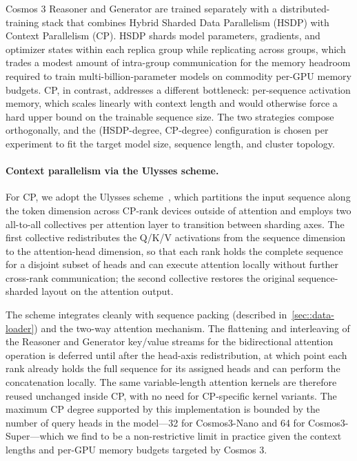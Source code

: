 Cosmos 3 Reasoner and Generator are trained separately with a distributed-training stack that combines Hybrid Sharded Data Parallelism (HSDP) with Context Parallelism (CP). HSDP shards model parameters, gradients, and optimizer states within each replica group while replicating across groups, which trades a modest amount of intra-group communication for the memory headroom required to train multi-billion-parameter models on commodity per-GPU memory budgets. CP, in contrast, addresses a different bottleneck: per-sequence activation memory, which scales linearly with context length and would otherwise force a hard upper bound on the trainable sequence size. The two strategies compose orthogonally, and the (HSDP-degree, CP-degree) configuration is chosen per experiment to fit the target model size, sequence length, and cluster topology.

\paragraph{Context parallelism via the Ulysses scheme.}

For CP, we adopt the Ulysses scheme~\citep{deepspeed_ulysses}, which partitions the input sequence along the token dimension across CP-rank devices outside of attention and employs two all-to-all collectives per attention layer to transition between sharding axes. The first collective redistributes the Q/K/V activations from the sequence dimension to the attention-head dimension, so that each rank holds the complete sequence for a disjoint subset of heads and can execute attention locally without further cross-rank communication; the second collective restores the original sequence-sharded layout on the attention output.

The scheme integrates cleanly with sequence packing (described in~\cref{sec::data-loader}) and the two-way attention mechanism. The flattening and interleaving of the Reasoner and Generator key/value streams for the bidirectional attention operation is deferred until after the head-axis redistribution, at which point each rank already holds the full sequence for its assigned heads and can perform the concatenation locally. The same variable-length attention kernels are therefore reused unchanged inside CP, with no need for CP-specific kernel variants. The maximum CP degree supported by this implementation is bounded by the number of query heads in the model---32 for Cosmos3-Nano and 64 for Cosmos3-Super---which we find to be a non-restrictive limit in practice given the context lengths and per-GPU memory budgets targeted by Cosmos 3.

